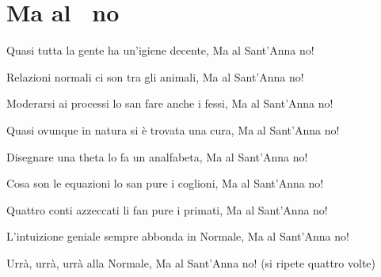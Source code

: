 \section{Ma al \santanna\ no}
\subtitle{Sulla melodia di “Ma la notte no”}
\begin{canzone}
Quasi tutta la gente ha un’igiene decente,
Ma al Sant'Anna no!

Relazioni normali ci son tra gli animali,
Ma al Sant'Anna no!

Moderarsi ai processi lo san fare anche i fessi,
Ma al Sant'Anna no!

Quasi ovunque in natura si è trovata una cura,
Ma al Sant'Anna no!

Disegnare una theta lo fa un analfabeta,
Ma al Sant'Anna no!

Cosa son le equazioni lo san pure i coglioni,
Ma al Sant'Anna no!

Quattro conti azzeccati li fan pure i primati,
Ma al Sant'Anna no!

L’intuizione geniale sempre abbonda in Normale,
Ma al Sant'Anna no!

Urrà, urrà, urrà alla Normale,
Ma al Sant'Anna no! 
(si ripete quattro volte)
\end{canzone}

